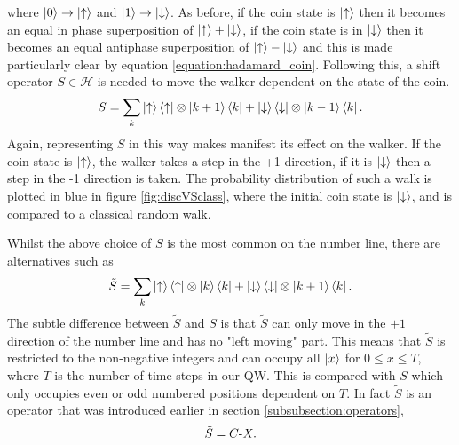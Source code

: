where $\ket{0} \rightarrow \ket{\uparrow}$ and $\ket{1} \rightarrow \ket{\downarrow}$.
As before, if the coin state is $\ket{\uparrow}$ then it becomes an equal in phase superposition of $\ket{\uparrow} + \ket{\downarrow}$, if the coin state is in $\ket{\downarrow}$ then it becomes an equal antiphase superposition of $\ket{\uparrow} - \ket{\downarrow}$ and this is made particularly clear by equation \ref{equation:hadamard_coin}.
Following this, a shift operator $S \in \mathcal{H}$ is needed to move the walker dependent on the state of the coin.
\begin{equation}
    S = \sum_k \ket{\uparrow}\bra{\uparrow} \otimes \ket{k + 1}\bra{k} + \ket{\downarrow}\bra{\downarrow} \otimes \ket{k - 1}\bra{k}.
\end{equation}
Again, representing $S$ in this way makes manifest its effect on the walker. 
If the coin state is $\ket{\uparrow}$, the walker takes a step in the +1 direction, if it is $\ket{\downarrow}$ then a step in the -1 direction is taken.
The probability distribution of such a walk is plotted in blue in figure \ref{fig:discVSclass}, where the initial coin state is $\ket{\downarrow}$, and is compared to a classical random walk.

Whilst the above choice of $S$ is the most common on the number line, there are alternatives such as
\begin{equation}
    \tilde{S} = \sum_k \ket{\uparrow}\bra{\uparrow} \otimes \ket{k}\bra{k} + \ket{\downarrow}\bra{\downarrow} \otimes \ket{k + 1}\bra{k}.
\end{equation}
The subtle difference between $\tilde{S}$ and $S$ is that $\tilde{S}$ can only move in the $+1$ direction of the number line and has no "left moving" part.
This means that $\tilde{S}$ is restricted to the non-negative integers and can occupy all $\ket{x}$ for $0\leq x\leq T$, where $T$ is the number of time steps in our QW.
This is compared with $S$ which only occupies even or odd numbered positions dependent on $T$.
In fact $\tilde{S}$ is an operator that was introduced earlier in section \ref{subsubsection:operators},
\begin{equation}
    \tilde{S} = C\text{-}X.
\end{equation}
\FloatBarrier